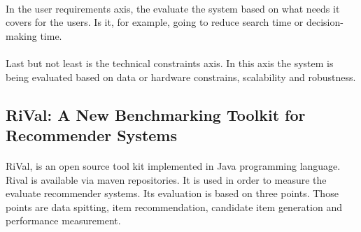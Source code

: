 \paragraph{}In the user requirements axis, the evaluate the system based on what needs it covers for the users. Is it, for example, going to reduce search time or decision-making time.

\paragraph{}Last but not least is the technical constraints axis. In this axis the system is being evaluated based on data or hardware constrains, scalability and robustness.

\subsection{RiVal: A New Benchmarking Toolkit for Recommender Systems \cite{said2014rival}}
\paragraph{}RiVal, is an open source tool kit implemented in Java programming language. Rival is available via maven repositories. It is used in order to measure the evaluate recommender systems. Its evaluation is based on three points. Those points are data spitting, item recommendation, candidate item generation and performance measurement. 